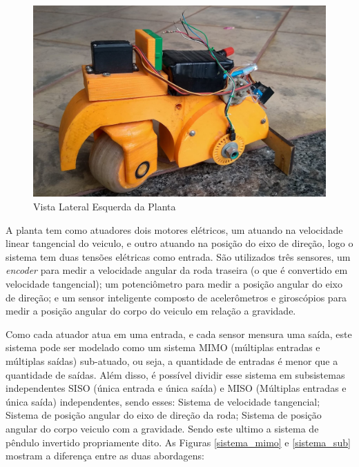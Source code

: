 \documentclass[conference,harvard,brazil,english]{sbatex}
\begin{document}
        \begin{figure}[!ht] 
        \centering \includegraphics[width=\columnwidth]{imagens/motinha2.jpg}{
            \small
            \centering
            \caption{Vista Lateral Esquerda da Planta}
            \label{motinha2}}
        \end{figure}
        
        A planta tem como atuadores dois motores elétricos, um atuando na velocidade linear tangencial do veiculo, e outro atuando na posição do eixo de direção, logo o sistema tem duas tensões elétricas como entrada. São utilizados três sensores, um \textit{encoder} para medir a velocidade angular da roda traseira (o que é convertido em velocidade tangencial); um potenciômetro para medir a posição angular do eixo de direção; e um sensor inteligente composto de acelerômetros e giroscópios para medir a posição angular do corpo do veiculo em relação a gravidade.
        
        Como cada atuador atua em uma entrada, e cada sensor mensura uma saída, este sistema pode ser modelado como um sistema MIMO (múltiplas entradas e múltiplas saídas) sub-atuado, ou seja, a quantidade de entradas é menor que a quantidade de saídas. Além disso, é possível  dividir esse sistema em subsistemas independentes SISO (única entrada e única saída) e MISO (Múltiplas entradas e única saída) independentes, sendo esses: Sistema de velocidade tangencial; Sistema de posição angular do eixo de direção da roda; Sistema de posição angular do corpo veiculo com a gravidade. Sendo este ultimo a sistema de pêndulo invertido propriamente dito. As Figuras \ref{sistema_mimo} e \ref{sistema_sub} mostram a diferença entre as duas abordagens:
        
\end{document}
